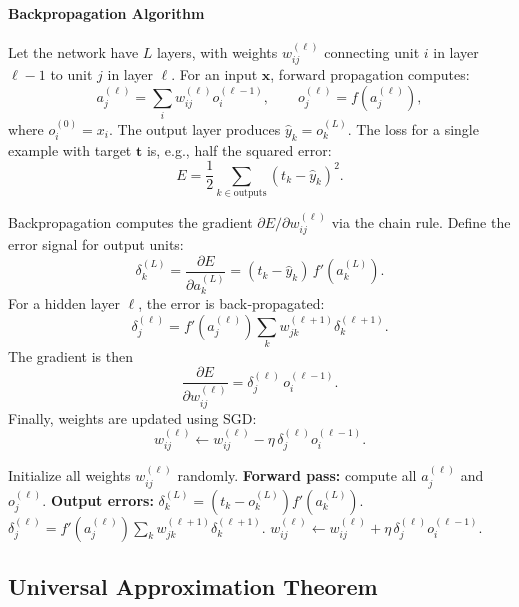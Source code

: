 \documentclass{tufte-handout}
\begin{document}
\paragraph{Backpropagation Algorithm}

Let the network have $L$ layers, with weights $w_{ij}^{(\ell)}$ connecting unit $i$ in layer $\ell-1$ to unit $j$ in layer $\ell$. For an input $\mathbf{x}$, forward propagation computes:
\[
a_j^{(\ell)} = \sum_i w_{ij}^{(\ell)} o_i^{(\ell-1)},\qquad o_j^{(\ell)} = f(a_j^{(\ell)}),
\]
where $o_i^{(0)} = x_i$. The output layer produces $\hat{y}_k = o_k^{(L)}$. The loss for a single example with target $\mathbf{t}$ is, e.g., half the squared error:
\[
E = \frac{1}{2} \sum_{k \in \text{outputs}} (t_k - \hat{y}_k)^2.
\]

Backpropagation computes the gradient $\partial E / \partial w_{ij}^{(\ell)}$ via the chain rule. Define the error signal for output units:
\[
\delta_k^{(L)} = \frac{\partial E}{\partial a_k^{(L)}} = (t_k - \hat{y}_k) \, f'(a_k^{(L)}).
\]
For a hidden layer $\ell$, the error is back‑propagated:
\[
\delta_j^{(\ell)} = f'(a_j^{(\ell)}) \sum_{k} w_{jk}^{(\ell+1)} \delta_k^{(\ell+1)}.
\]
The gradient is then
\[
\frac{\partial E}{\partial w_{ij}^{(\ell)}} = \delta_j^{(\ell)} \, o_i^{(\ell-1)}.
\]
Finally, weights are updated using SGD:
\[
w_{ij}^{(\ell)} \leftarrow w_{ij}^{(\ell)} - \eta \, \delta_j^{(\ell)} o_i^{(\ell-1)}.
\]

\begin{algorithm}[h]
    \caption{Backpropagation (online version)}
    \begin{algorithmic}[1]
        \STATE Initialize all weights $w_{ij}^{(\ell)}$ randomly.
            \STATE \textbf{Forward pass:} compute all $a_j^{(\ell)}$ and $o_j^{(\ell)}$.
            \STATE \textbf{Output errors:} $\delta_k^{(L)} = (t_k - o_k^{(L)}) f'(a_k^{(L)})$.
                \STATE $\delta_j^{(\ell)} = f'(a_j^{(\ell)}) \sum_k w_{jk}^{(\ell+1)} \delta_k^{(\ell+1)}$.
            \ENDFOR
                \STATE $w_{ij}^{(\ell)} \leftarrow w_{ij}^{(\ell)} + \eta \, \delta_j^{(\ell)} o_i^{(\ell-1)}$.
            \ENDFOR
        \ENDFOR
    \end{algorithmic}
\end{algorithm}

\subsection{Universal Approximation Theorem}
\label{sec:UAT}
\end{document}
